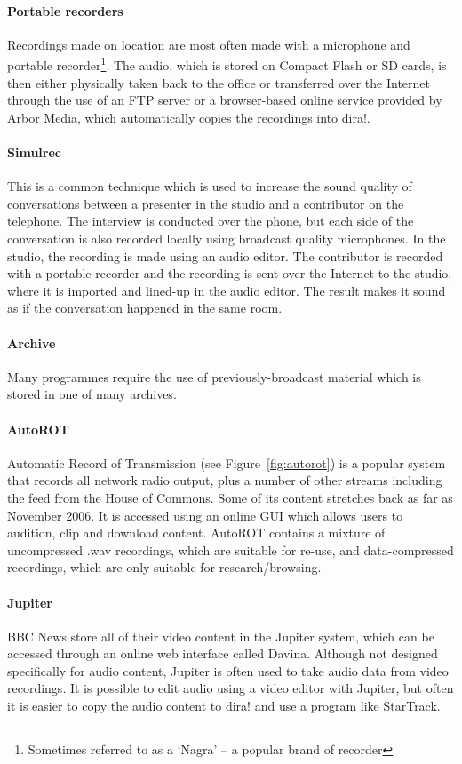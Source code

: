 \paragraph{Portable recorders}
Recordings made on location are most often made with a microphone and portable
recorder\footnote{Sometimes referred to as a `Nagra' -- a popular brand of
recorder}. The audio, which is stored on Compact Flash or SD cards, is then
either physically taken back to the office or transferred over the Internet
through the use of an FTP server or a browser-based online service provided by
Arbor Media, which automatically copies the recordings into dira!.

\paragraph{Simulrec}
This is a common technique which is used to increase the sound quality of
conversations between a presenter in the studio and a contributor on the
telephone. The interview is conducted over the phone, but each side of the
conversation is also recorded locally using broadcast quality microphones. In
the studio, the recording is made using an audio editor. The contributor is
recorded with a portable recorder and the recording is sent over the Internet
to the studio, where it is imported and lined-up in the audio editor. The
result makes it sound as if the conversation happened in the same room.

\paragraph{Archive} Many programmes require the use of previously-broadcast
material which is stored in one of many archives.

\paragraph{AutoROT} Automatic Record of Transmission (see
Figure~\ref{fig:autorot}) is a popular system that records all network radio
output, plus a number of other streams including the feed from the House of
Commons.  Some of its content stretches back as far as November 2006.  It is
accessed using an online GUI which allows users to audition, clip and download
content.  AutoROT contains a mixture of uncompressed .wav recordings, which are
suitable for re-use, and data-compressed recordings, which are only suitable
for research/browsing.

\paragraph{Jupiter} BBC News store all of their video content in the Jupiter
system, which can be accessed through an online web interface called Davina.
Although not designed specifically for audio content, Jupiter is often used to
take audio data from video recordings.  It is possible to edit audio using a
video editor with Jupiter, but often it is easier to copy the audio content to
dira! and use a program like StarTrack.

